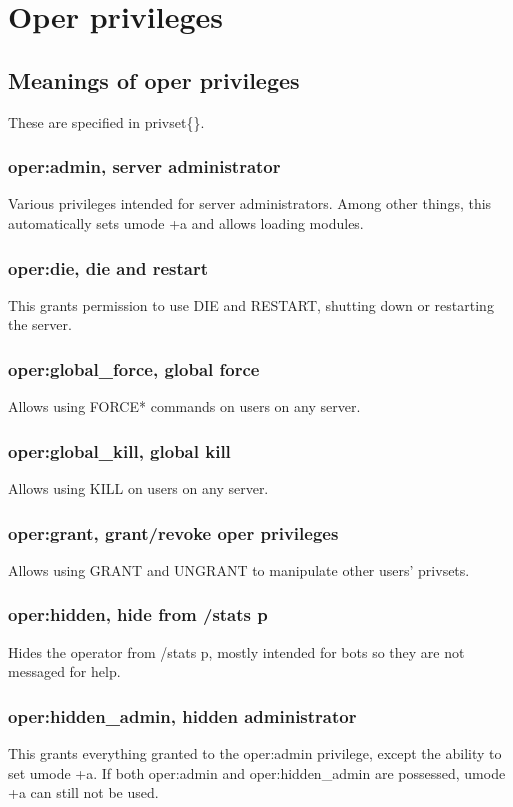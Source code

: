 \chapter{Oper privileges}
\label{oprivs}

\section{Meanings of oper privileges}
\label{oprivlist}

These are specified in privset\{\}.

\subsection{oper:admin, server administrator}
	Various privileges intended for server administrators. Among other
	things, this automatically sets umode +a and allows loading modules.

\subsection{oper:die, die and restart}
	This grants permission to use DIE and RESTART, shutting down
	or restarting the server.

\subsection{oper:global\_force, global force}
	Allows using FORCE* commands on users on any server.

\subsection{oper:global\_kill, global kill}
	Allows using KILL on users on any server.

\subsection{oper:grant, grant/revoke oper privileges}
	Allows using GRANT and UNGRANT to manipulate other users'
        privsets.

\subsection{oper:hidden, hide from /stats p}
	Hides the operator from /stats p, mostly intended for bots so they are
	not messaged for help.

\subsection{oper:hidden\_admin, hidden administrator}
	This grants everything granted to the oper:admin privilege, except the
	ability to set umode +a. If both oper:admin and	oper:hidden\_admin are
	possessed, umode +a can still not be used.

